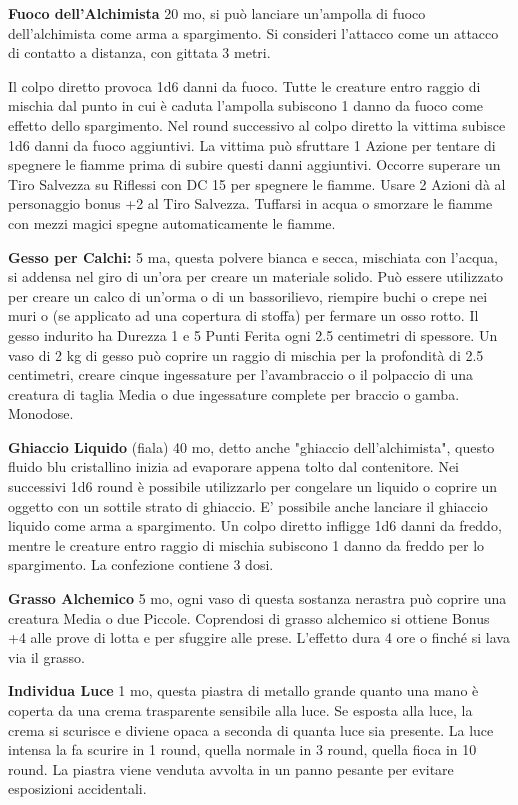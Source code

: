 \documentclass[12pt,a4paper,twoside,openany]{book}
\begin{document}
\begin{multicols}{2}
\textbf{Fuoco dell'Alchimista} 20 mo, si può lanciare un'ampolla di fuoco dell'alchimista come arma a spargimento. Si consideri l'attacco come un attacco di contatto a distanza, con gittata 3 metri.

Il colpo diretto provoca 1d6 danni da fuoco. Tutte le creature entro raggio di mischia dal punto in cui è caduta l'ampolla subiscono 1 danno da fuoco come effetto dello spargimento. Nel round successivo al colpo diretto la vittima subisce 1d6 danni da fuoco aggiuntivi. La vittima può sfruttare 1 Azione per tentare di spegnere le fiamme prima di subire questi danni aggiuntivi. Occorre superare un Tiro Salvezza su Riflessi con DC 15 per spegnere le fiamme. Usare 2 Azioni dà al personaggio bonus +2 al Tiro Salvezza. Tuffarsi in acqua o smorzare le fiamme con mezzi magici spegne automaticamente le fiamme.

\textbf{Gesso per Calchi:} 5 ma, questa polvere bianca e secca, mischiata con l'acqua, si addensa nel giro di un'ora per creare un materiale solido. Può essere utilizzato per creare un calco di un'orma o di un bassorilievo, riempire buchi o crepe nei muri o (se applicato ad una copertura di stoffa) per fermare un osso rotto. Il gesso indurito ha Durezza 1 e 5 Punti Ferita ogni 2.5 centimetri di spessore. Un vaso di 2 kg di gesso può coprire un raggio di mischia per la profondità di 2.5 centimetri, creare cinque ingessature per l'avambraccio o il polpaccio di una creatura di taglia Media o due ingessature complete per braccio o gamba. Monodose.

\textbf{Ghiaccio Liquido} (fiala) 40 mo, detto anche "ghiaccio dell'alchimista", questo fluido blu cristallino inizia ad evaporare appena tolto dal contenitore. Nei successivi 1d6 round è possibile utilizzarlo per congelare un liquido o coprire un oggetto con un sottile strato di ghiaccio. E' possibile anche lanciare il ghiaccio liquido come arma a spargimento. Un colpo diretto infligge 1d6 danni da freddo, mentre le creature entro raggio di mischia subiscono 1 danno da freddo per lo spargimento. La confezione contiene 3 dosi.

\textbf{Grasso Alchemico} 5 mo, ogni vaso di questa sostanza nerastra può coprire una creatura Media o due Piccole. Coprendosi di grasso alchemico si ottiene Bonus +4 alle prove di lotta e per sfuggire alle prese. L'effetto dura 4 ore o finché si lava via il grasso.

\textbf{Individua Luce} 1 mo, questa piastra di metallo grande quanto una mano è coperta da una crema trasparente sensibile alla luce. Se esposta alla luce, la crema si scurisce e diviene opaca a seconda di quanta luce sia presente. La luce intensa la fa scurire in 1 round, quella normale in 3 round, quella fioca in 10 round.
La piastra viene venduta avvolta in un panno pesante per evitare esposizioni accidentali. 


\end{multicols}
\end{document}
